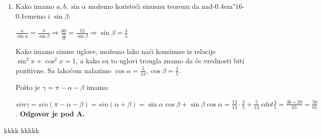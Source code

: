 \documentclass[a4paper,12pt]{report}
\def\dj{d\kern-0.4em\char"16\kern-0.1em}
\begin{document}
\begin{enumerate}[1.]
\item Kako imamo $a,b,\sin{\alpha} $ mo\v{z}emo koriste\'{c}i sinusnu teorenu da na\dj{}emo i $\sin{\beta}$:
\par $ \frac{a}{\sin{\alpha}}= \frac{b}{\sin{\beta}}  \Longrightarrow \frac{60}{\frac{12}{13}}= \frac{52}{\sin{\beta}} \Longrightarrow \sin{\beta} = \frac{4}{5} $
\par Kako imamo sinuse uglove, mo\v{z}emo lako na\'{c}i konsinuse iz relacije $\sin^2  x  +\cos^2  x  = 1$, a kako su to uglovi trougla znamo da \'{c}e vrednosti biti pozitivne. Sa lako\'{c}om nalazimo $\cos{\alpha} = \frac{5}{13}, \cos{\beta} = \frac{3}{5} $.
\par Po\v{s}to je $\gamma = \pi - \alpha - \beta$ imamo: 
\par $sin{\gamma} = sin(\pi - \alpha - \beta)= sin( \alpha + \beta) = \sin{\alpha}\cos{\beta} + \sin{\beta} \cos{\alpha} = \frac{12}{13}\cdot \frac{3}{5} + \frac{5}{13} \ cdot \frac{4}{5} = \frac{36+20}{65} = \frac{56}{65} $. \textbf{Odgovor je pod A.}





\end{enumerate}





\begin{thebibliography}{9}
 kkkk
 kkkkk

\end{thebibliography}
\end{document}
